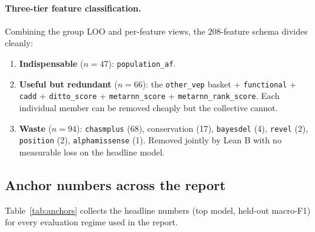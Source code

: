 \documentclass[11pt,a4paper]{article}
\begin{document}
\paragraph{Three-tier feature classification.}
Combining the group LOO and per-feature views, the $208$-feature schema
divides cleanly:

\begin{enumerate}[leftmargin=*]
 \item \textbf{Indispensable} ($n=47$): \texttt{population\_af}.
 \item \textbf{Useful but redundant} ($n=66$): the
 \texttt{other\_vep} basket + \texttt{functional} +
 \texttt{cadd} + \texttt{ditto\_score} +
 \texttt{metarnn\_score} + \texttt{metarnn\_rank\_score}.
 Each individual member can be removed cheaply but the
 collective cannot.
 \item \textbf{Waste} ($n=94$): \texttt{chasmplus} (68), conservation
 (17), \texttt{bayesdel} (4), \texttt{revel} (2),
 \texttt{position} (2), \texttt{alphamissense} (1). Removed
 jointly by Lean B with no measurable loss on the headline
 model.
\end{enumerate}

\subsection{Anchor numbers across the report}

Table~\ref{tab:anchors} collects the headline numbers (top model, held-out
macro-F1) for every evaluation regime used in the report.
\end{document}
